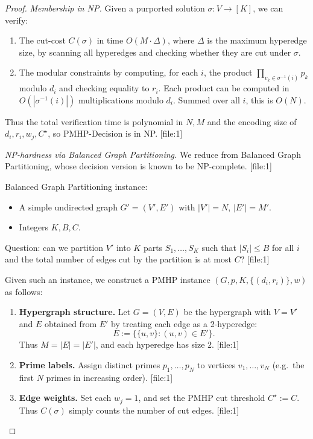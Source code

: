 \documentclass[11pt]{article}
\begin{document}
\begin{proof}
\emph{Membership in NP.}
Given a purported solution $\sigma:V\to[K]$, we can verify:
\begin{enumerate}
  \item The cut-cost $C(\sigma)$ in time $O(M\cdot\Delta)$, where $\Delta$ is the maximum hyperedge size, by scanning all hyperedges and checking whether they are cut under $\sigma$.
  \item The modular constraints by computing, for each $i$, the product $\prod_{v_k\in\sigma^{-1}(i)} p_k$ modulo $d_i$ and checking equality to $r_i$. Each product can be computed in $O(|\sigma^{-1}(i)|)$ multiplications modulo $d_i$. Summed over all $i$, this is $O(N)$.
\end{enumerate}
Thus the total verification time is polynomial in $N,M$ and the encoding size of $d_i,r_i, w_j, C^\star$, so PMHP-Decision is in NP. [file:1]

\emph{NP-hardness via Balanced Graph Partitioning.}
We reduce from Balanced Graph Partitioning, whose decision version is known to be NP-complete. [file:1]

Balanced Graph Partitioning instance:
\begin{itemize}
  \item A simple undirected graph $G'=(V',E')$ with $|V'|=N$, $|E'|=M'$.
  \item Integers $K,B,C$.
\end{itemize}
Question: can we partition $V'$ into $K$ parts $S_1,\dots,S_K$ such that $|S_i|\le B$ for all $i$ and the total number of edges cut by the partition is at most $C$? [file:1]

Given such an instance, we construct a PMHP instance $(G,p,K,\{(d_i,r_i)\},w)$ as follows:

\begin{enumerate}[label=(\alph*)]
  \item \textbf{Hypergraph structure.} Let $G=(V,E)$ be the hypergraph with $V=V'$ and $E$ obtained from $E'$ by treating each edge as a 2-hyperedge:
  \[
    E := \{ \{u,v\} : (u,v)\in E' \}.
  \]
  Thus $M = |E| = |E'|$, and each hyperedge has size $2$. [file:1]

  \item \textbf{Prime labels.} Assign distinct primes $p_1,\dots,p_N$ to vertices $v_1,\dots,v_N$ (e.g.\ the first $N$ primes in increasing order). [file:1]

  \item \textbf{Edge weights.} Set each $w_j = 1$, and set the PMHP cut threshold $C^\star := C$. Thus $C(\sigma)$ simply counts the number of cut edges. [file:1]


\end{enumerate}
\end{proof}
\end{document}
